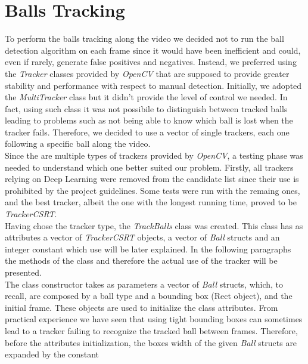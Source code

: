 \section{Balls Tracking}

To perform the balls tracking along the video we decided not to run the ball detection algorithm on each frame since it would have been inefficient and could, even if rarely, generate false positives and negatives.
Instead, we preferred using the \textit{Tracker} classes provided by \textit{OpenCV} that are supposed to provide greater stability and performance with respect to manual detection.
Initially, we adopted the \textit{MultiTracker} class but it didn't provide the level of control we needed. In fact, using such class it was not possibile to distinguish
between tracked balls leading to problems such as not being able to know which ball is lost when the tracker fails. Therefore, we decided to use a vector of single trackers,
each one following a specific ball along the video.
\newline \\
Since the are multiple types of trackers provided by \textit{OpenCV}, a testing phase was needed to understand which one better suited our problem. Firstly, all trackers
relying on Deep Learning were removed from the candidate list since their use is prohibited by the project guidelines. Some tests were run with the remaing ones, and the best tracker,
albeit the one with the longest running time, proved to be \textit{TrackerCSRT}.
\newline \\
Having chose the tracker type, the \textit{TrackBalls} class was created. This class has as attributes a vector of \textit{TrackerCSRT} objects, a vector of \textit{Ball} structs
and an integer constant which use will be later explained. In the following paragraphs the methods of the class and therefore the actual use of the tracker will be presented.
\newline \\
The class constructor takes as parameters a vector of \textit{Ball} structs, which, to recall, are composed by a ball type and a bounding box (Rect object), and the initial frame.
These objects are used to initialize the class attributes. From practical experience we have seen that using tight bounding boxes can sometimes lead to a tracker failing
to recognize the tracked ball between frames. Therefore, before the attributes initialization, the boxes width of the given \textit{Ball} structs are expanded by the constant
